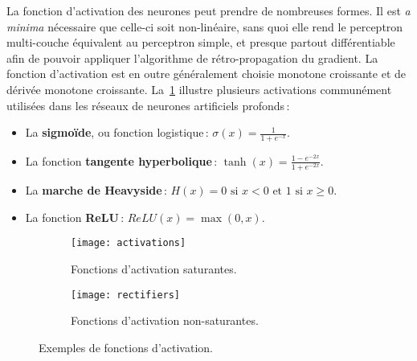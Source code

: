 La fonction d'activation des neurones peut prendre de nombreuses formes. Il est \emph{a minima} nécessaire que celle-ci soit non-linéaire, sans quoi elle rend le perceptron multi-couche équivalent au perceptron simple, et presque partout différentiable afin de pouvoir appliquer l'algorithme de rétro-propagation du gradient. La fonction d'activation est en outre généralement choisie monotone croissante et de dérivée monotone croissante. La~\cref{fig:saturantes} illustre plusieurs activations communément utilisées dans les réseaux de neurones artificiels profonds\,:
\begin{itemize}
  \item La \textbf{sigmoïde}, ou fonction logistique\,: $\sigma(x) = \frac{1}{1 + e^{-x}}$.
  \item La fonction \textbf{tangente hyperbolique}\,: $\tanh(x) = \frac{1 - e^{-2x}}{1 + e^{-2x}}$.
  \item La \textbf{marche de Heavyside}\,: $H(x) = 0 \text{ si } x < 0 \text{ et } 1 \text{ si } x \geq 0$.
  \item La fonction \textbf{\gls{ReLU}}\,: $ReLU(x) = \max(0,x)$.
\end{itemize}

\begin{figure}[t]
  \begin{subfigure}[b]{0.5\textwidth}
    \texttt{[image: activations]}
    \caption{Fonctions d'activation saturantes.}
    \label{fig:saturantes}
  \end{subfigure}
\begin{subfigure}[b]{0.5\textwidth}
  \texttt{[image: rectifiers]}
  \caption{Fonctions d'activation non-saturantes.}
  \label{fig:rectifiers}
\end{subfigure}
\caption{Exemples de fonctions d'activation.}
\label{fig:activations}
\end{figure}

